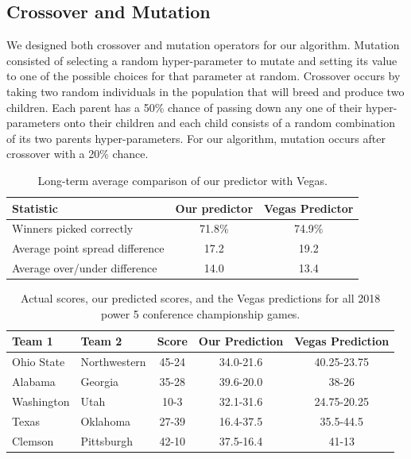 \documentclass[10pt,twocolumn,letterpaper]{article}
\begin{document}
\subsection{Crossover and Mutation}
We designed both crossover and mutation operators for our algorithm.  Mutation consisted of selecting a random hyper-parameter to mutate and setting its value to one of the possible choices for that parameter at random.  Crossover occurs by taking two random individuals in the population that will breed and produce two children.  Each parent has a 50\% chance of passing down any one of their hyper-parameters onto their children and each child consists of a random combination of its two parents hyper-parameters.  For our algorithm, mutation occurs after crossover with a 20\% chance.

\begin{table}
\begin{tabular}{lcc}
\hline
Statistic&Our predictor & Vegas Predictor\\\hline
Winners picked correctly & 71.8\% & 74.9\%\\
Average point spread difference & 17.2 & 19.2\\
Average over/under difference & 14.0 & 13.4\\
\hline
\end{tabular}
\caption{\label{tab:vegascomp} Long-term average comparison of our predictor with Vegas.}
\end{table}

\begin{table}
\begin{tabular}{llccc}
\hline
Team 1 & Team 2 & Score & Our Prediction & Vegas Prediction\\\hline
Ohio State & Northwestern&45-24&34.0-21.6&40.25-23.75\\
Alabama&Georgia&35-28&39.6-20.0&38-26\\
Washington&Utah&10-3&32.1-31.6&24.75-20.25\\
Texas&Oklahoma&27-39&16.4-37.5&35.5-44.5\\
Clemson&Pittsburgh&42-10&37.5-16.4&41-13\\
\hline
\end{tabular}
\caption{\label{tab:casestudyscores} Actual scores, our predicted scores, and the Vegas predictions for all 2018 power 5 conference championship games.}
\end{table}
\end{document}
